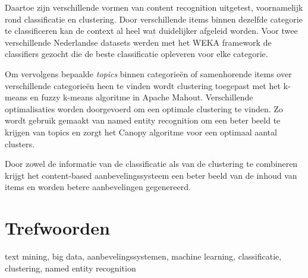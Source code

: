 {Daartoe zijn verschillende vormen van content recognition uitgetest, voornamelijk rond classificatie en clustering. Door verschillende items binnen dezelfde categorie te classificeren kan de context al heel wat duidelijker afgeleid worden. Voor twee verschillende Nederlandse datasets werden met het WEKA framework de classifiers gezocht die de beste classificatie opleveren voor elke categorie.

Om vervolgens bepaalde \textit{topics} binnen categorie\"en of samenhorende items over verschillende categorie\"en heen te vinden wordt clustering toegepast met het k-means en fuzzy k-means algoritme in Apache Mahout. Verschillende optimalisaties worden doorgevoerd om een optimale clustering te vinden. Zo wordt gebruik gemaakt van named entity recognition om een beter beeld te krijgen van topics en zorgt het Canopy algoritme voor een optimaal aantal clusters.

Door zowel de informatie van de classificatie als van de clustering te combineren krijgt het content-based aanbevelingssysteem een beter beeld van de inhoud van items en worden betere aanbevelingen gegenereerd. 

\section*{Trefwoorden}

text mining, big data, aanbevelingssystemen, machine learning, classificatie, clustering, named entity recognition

}

\newpage %



